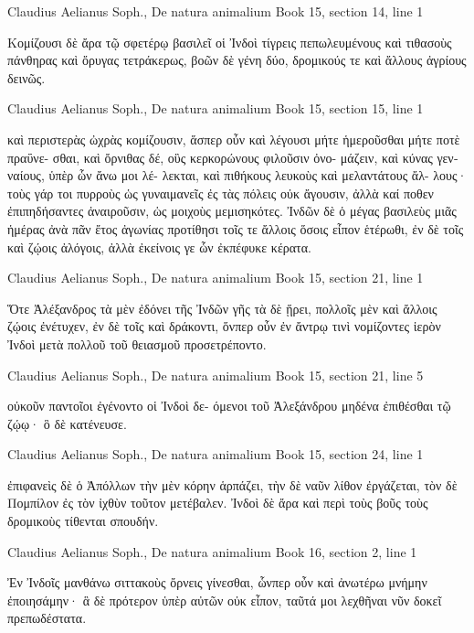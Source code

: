 \documentclass[12pt,letterpaper,twoside,final]{memoir}
\begin{document}
\begin{greek}
Claudius Aelianus Soph., De natura animalium 
Book 15, section 14, line 1

Κομίζουσι δὲ ἄρα τῷ σφετέρῳ βασιλεῖ οἱ Ἰνδοὶ 
τίγρεις πεπωλευμένους καὶ τιθασοὺς πάνθηρας καὶ 
ὄρυγας τετράκερως, βοῶν δὲ γένη δύο, δρομικούς τε 
καὶ ἄλλους ἀγρίους δεινῶς. 



Claudius Aelianus Soph., De natura animalium 
Book 15, section 15, line 1

           καὶ περιστερὰς ὠχρὰς κομίζουσιν, ἅσπερ 
οὖν καὶ λέγουσι μήτε ἡμεροῦσθαι μήτε ποτὲ πραΰνε-
σθαι, καὶ ὄρνιθας δέ, οὓς κερκορώνους φιλοῦσιν ὀνο-
μάζειν, καὶ κύνας γενναίους, ὑπὲρ ὧν ἄνω μοι λέ-
λεκται, καὶ πιθήκους λευκοὺς καὶ μελαντάτους ἄλ-
λους· τοὺς γάρ τοι πυρροὺς ὡς γυναιμανεῖς ἐς τὰς 
πόλεις οὐκ ἄγουσιν, ἀλλὰ καί ποθεν ἐπιπηδήσαντες 
ἀναιροῦσιν, ὡς μοιχοὺς μεμισηκότες. 
 Ἰνδῶν δὲ ὁ μέγας βασιλεὺς μιᾶς ἡμέρας ἀνὰ πᾶν   
ἔτος ἀγωνίας προτίθησι τοῖς τε ἄλλοις ὅσοις εἶπον 
ἑτέρωθι, ἐν δὲ τοῖς καὶ ζῴοις ἀλόγοις, ἀλλὰ ἐκείνοις 
γε ὧν ἐκπέφυκε κέρατα. 



Claudius Aelianus Soph., De natura animalium 
Book 15, section 21, line 1

Ὅτε Ἀλέξανδρος τὰ μὲν ἐδόνει τῆς Ἰνδῶν γῆς 
τὰ δὲ ᾕρει, πολλοῖς μὲν καὶ ἄλλοις ζῴοις ἐνέτυχεν, 
ἐν δὲ τοῖς καὶ δράκοντι, ὅνπερ οὖν ἐν ἄντρῳ τινὶ 
νομίζοντες ἱερὸν Ἰνδοὶ μετὰ πολλοῦ τοῦ θειασμοῦ 
προσετρέποντο. 



Claudius Aelianus Soph., De natura animalium 
Book 15, section 21, line 5

                οὐκοῦν παντοῖοι ἐγένοντο οἱ Ἰνδοὶ δε-
όμενοι τοῦ Ἀλεξάνδρου μηδένα ἐπιθέσθαι τῷ ζῴῳ· ὃ 
δὲ κατένευσε. 



Claudius Aelianus Soph., De natura animalium 
Book 15, section 24, line 1

ἐπιφανεὶς δὲ ὁ Ἀπόλλων τὴν μὲν κόρην ἁρπάζει, τὴν 
δὲ ναῦν λίθον ἐργάζεται, τὸν δὲ Πομπίλον ἐς τὸν 
ἰχθὺν τοῦτον μετέβαλεν. 
 Ἰνδοὶ δὲ ἄρα καὶ περὶ τοὺς βοῦς τοὺς δρομικοὺς 
τίθενται σπουδήν. 



Claudius Aelianus Soph., De natura animalium 
Book 16, section 2, line 1

Ἐν Ἰνδοῖς μανθάνω σιττακοὺς ὄρνεις γίνεσθαι, 
ὧνπερ οὖν καὶ ἀνωτέρω μνήμην ἐποιησάμην· ἃ δὲ 
πρότερον ὑπὲρ αὐτῶν οὐκ εἶπον, ταῦτά μοι λεχθῆναι 
νῦν δοκεῖ πρεπωδέστατα. 




\end{greek}
\end{document}
